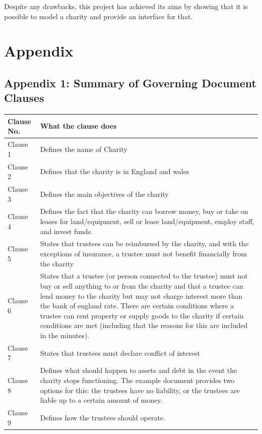 \documentclass{UoYCSproject}
\begin{document}
Despite any drawbacks, this project has achieved its aims by showing that it is possible to model a charity and provide an interface for that.


\chapter{Appendix}
\label{cha:apendix}

\section{Appendix 1: Summary of Governing Document Clauses}
\label{sec:apendix_1_gov_doc_sumary}

\begin{longtable}{|p{}|p{}|}
  \hline
  \textbf{Clause No.} & \textbf{What the clause does} \\\hline
  \endfirsthead
    \endhead
  Clause 1 & 
          Defines the name of Charity \\\hline
  Clause 2 & 
          Defines that the charity is in England and wales \\\hline
  Clause 3 & 
          Defines the main objectives of the charity \\\hline
  Clause 4 & 
          Defines the fact that the charity can borrow money, buy or take on leases for land/equipment, sell or lease land/equipment, employ staff, and invest funds. \\\hline
  Clause 5 & 
          States that trustees can be reimbursed by the charity, and with the exceptions of insurance, a trustee must not benefit financially from the charity \\\hline
  Clause 6 & 
          States that a trustee (or person connected to the trustee) must not buy or sell anything to or from the charity and that a trustee can lend money to the charity but may not charge interest more than the bank of england rate. There are certain conditions where a trustee can rent property or supply goods to the charity if certain conditions are met (including that the reasons for this are included in the minutes). \\\hline
  Clause 7 & 
          States that trustees must declare conflict of interest \\\hline
  Clause 8 & 
          Defines what should happen to assets and debt in the event the charity stops functioning. The example document provides two options for this: the trustees have no liability, or the trustees are liable up to a certain amount of money. \\\hline
  Clause 9 & 
          Defines how the trustees should operate. 


\end{longtable}
\end{document}
